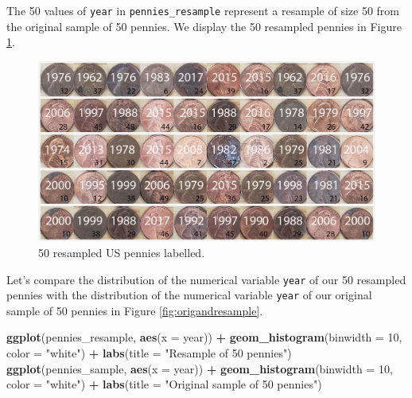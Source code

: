 \documentclass[
]{book}
\newenvironment{Shaded}{\begin{snugshade}}{\end{snugshade}}
\newcommand{\DataTypeTok}[1]{\textcolor[rgb]{0.13,0.29,0.53}{#1}}
\newcommand{\DecValTok}[1]{\textcolor[rgb]{0.00,0.00,0.81}{#1}}
\newcommand{\KeywordTok}[1]{\textcolor[rgb]{0.13,0.29,0.53}{\textbf{#1}}}
\newcommand{\NormalTok}[1]{#1}
\newcommand{\OperatorTok}[1]{\textcolor[rgb]{0.81,0.36,0.00}{\textbf{#1}}}
\newcommand{\StringTok}[1]{\textcolor[rgb]{0.31,0.60,0.02}{#1}}
\begin{document}
The 50 values of \texttt{year} in \texttt{pennies\_resample} represent a resample of size 50 from the original sample of 50 pennies. We display the 50 resampled pennies in Figure \ref{fig:resampling-exercise-d}.

\begin{figure}
\includegraphics[width=1\linewidth]{images/sampling/pennies/deliverable/4} \caption{50 resampled US pennies labelled.}\label{fig:resampling-exercise-d}
\end{figure}

Let's compare the distribution of the numerical variable \texttt{year} of our 50 resampled pennies with the distribution of the numerical variable \texttt{year} of our original sample of 50 pennies in Figure \ref{fig:origandresample}.

\begin{Shaded}
\begin{Highlighting}[]
\KeywordTok{ggplot}\NormalTok{(pennies_resample, }\KeywordTok{aes}\NormalTok{(}\DataTypeTok{x =}\NormalTok{ year)) }\OperatorTok{+}
\StringTok{  }\KeywordTok{geom_histogram}\NormalTok{(}\DataTypeTok{binwidth =} \DecValTok{10}\NormalTok{, }\DataTypeTok{color =} \StringTok{"white"}\NormalTok{) }\OperatorTok{+}
\StringTok{  }\KeywordTok{labs}\NormalTok{(}\DataTypeTok{title =} \StringTok{"Resample of 50 pennies"}\NormalTok{)}
\KeywordTok{ggplot}\NormalTok{(pennies_sample, }\KeywordTok{aes}\NormalTok{(}\DataTypeTok{x =}\NormalTok{ year)) }\OperatorTok{+}
\StringTok{  }\KeywordTok{geom_histogram}\NormalTok{(}\DataTypeTok{binwidth =} \DecValTok{10}\NormalTok{, }\DataTypeTok{color =} \StringTok{"white"}\NormalTok{) }\OperatorTok{+}
\StringTok{  }\KeywordTok{labs}\NormalTok{(}\DataTypeTok{title =} \StringTok{"Original sample of 50 pennies"}\NormalTok{)}
\end{Highlighting}
\end{Shaded}
\end{document}
